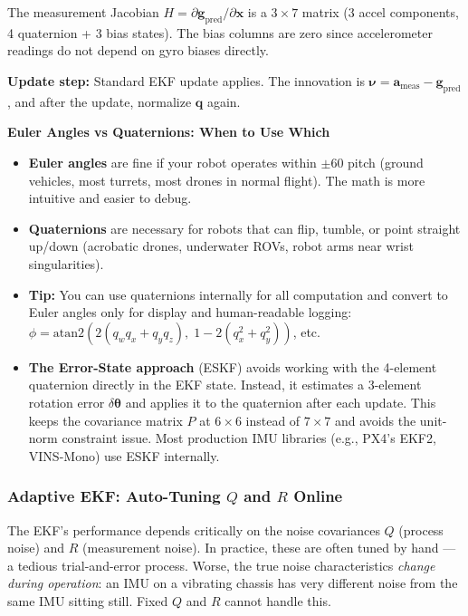 The measurement Jacobian $H = \partial \mathbf{g}_{\text{pred}} / \partial \mathbf{x}$ is a $3\times 7$ matrix (3 accel components, 4 quaternion + 3 bias states). The bias columns are zero since accelerometer readings do not depend on gyro biases directly.

\textbf{Update step:} Standard EKF update applies. The innovation is $\boldsymbol{\nu} = \mathbf{a}_{\text{meas}} - \mathbf{g}_{\text{pred}}$, and after the update, normalize $\mathbf{q}$ again.

\begin{mdframed}[linewidth=1pt, innertopmargin=10pt, innerbottommargin=10pt]
\textbf{Euler Angles vs Quaternions: When to Use Which}

\vspace{0.3em}
\begin{itemize}[nosep]
    \item \textbf{Euler angles} are fine if your robot operates within $\pm 60$\textdegree{} pitch (ground vehicles, most turrets, most drones in normal flight). The math is more intuitive and easier to debug.
    \item \textbf{Quaternions} are necessary for robots that can flip, tumble, or point straight up/down (acrobatic drones, underwater ROVs, robot arms near wrist singularities).
    \item \textbf{Tip:} You can use quaternions internally for all computation and convert to Euler angles only for display and human-readable logging: $\phi = \text{atan2}(2(q_w q_x + q_y q_z),\; 1 - 2(q_x^2 + q_y^2))$, etc.
    \item \textbf{The Error-State approach} (ESKF) avoids working with the 4-element quaternion directly in the EKF state. Instead, it estimates a 3-element rotation error $\delta\boldsymbol{\theta}$ and applies it to the quaternion after each update. This keeps the covariance matrix $P$ at $6\times 6$ instead of $7\times 7$ and avoids the unit-norm constraint issue. Most production IMU libraries (e.g., PX4's EKF2, VINS-Mono) use ESKF internally.
\end{itemize}
\end{mdframed}

\subsubsection{Adaptive EKF: Auto-Tuning \texorpdfstring{$Q$}{Q} and \texorpdfstring{$R$}{R} Online}

The EKF's performance depends critically on the noise covariances $Q$ (process noise) and $R$ (measurement noise). In practice, these are often tuned by hand --- a tedious trial-and-error process. Worse, the true noise characteristics \textit{change during operation}: an IMU on a vibrating chassis has very different noise from the same IMU sitting still. Fixed $Q$ and $R$ cannot handle this.

